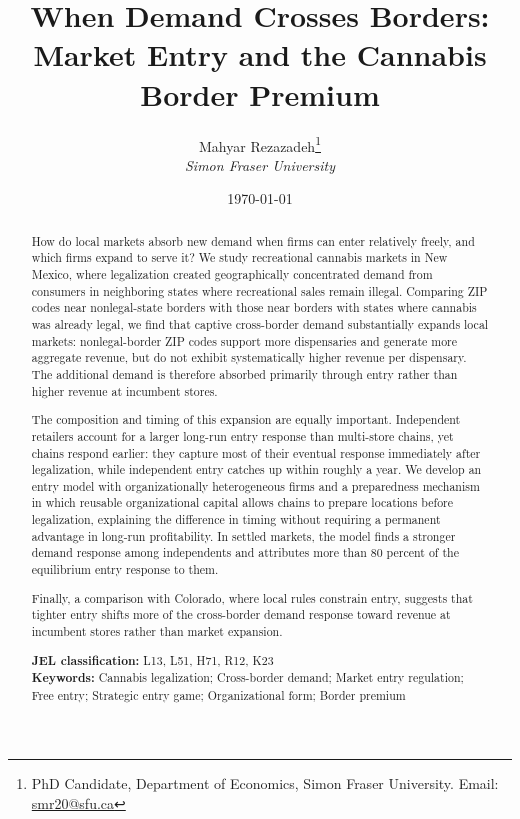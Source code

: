 \documentclass[english,12pt]{article}
\begin{document}
\sloppy
\title{When Demand Crosses Borders: Market Entry and the Cannabis Border Premium}
\author{Mahyar Rezazadeh\thanks{PhD Candidate, Department of Economics, Simon Fraser University. Email: \href{mailto:smr20@sfu.ca}{smr20@sfu.ca}}\\ {\small \emph{Simon Fraser University}}}
\date{\today}
\maketitle
\thispagestyle{empty}

\begin{abstract}
\noindent How do local markets absorb new demand when firms can enter relatively freely, and which firms expand to serve it? We study recreational cannabis markets in New Mexico, where legalization created geographically concentrated demand from consumers in neighboring states where recreational sales remain illegal. Comparing ZIP codes near nonlegal-state borders with those near borders with states where cannabis was already legal, we find that captive cross-border demand substantially expands local markets: nonlegal-border ZIP codes support more dispensaries and generate more aggregate revenue, but do not exhibit systematically higher revenue per dispensary. The additional demand is therefore absorbed primarily through entry rather than higher revenue at incumbent stores.

The composition and timing of this expansion are equally important. Independent retailers account for a larger long-run entry response than multi-store chains, yet chains respond earlier: they capture most of their eventual response immediately after legalization, while independent entry catches up within roughly a year. We develop an entry model with organizationally heterogeneous firms and a preparedness mechanism in which reusable organizational capital allows chains to prepare locations before legalization, explaining the difference in timing without requiring a permanent advantage in long-run profitability. In settled markets, the model finds a stronger demand response among independents and attributes more than 80 percent of the equilibrium entry response to them.

Finally, a comparison with Colorado, where local rules constrain entry, suggests that tighter entry shifts more of the cross-border demand response toward revenue at incumbent stores rather than market expansion.


\medskip
\noindent \textbf{JEL classification:} L13, L51, H71, R12, K23 \\
\noindent \textbf{Keywords:} Cannabis legalization; Cross-border demand; Market entry regulation; Free entry; Strategic entry game; Organizational form; Border premium
\end{abstract}
\end{document}

